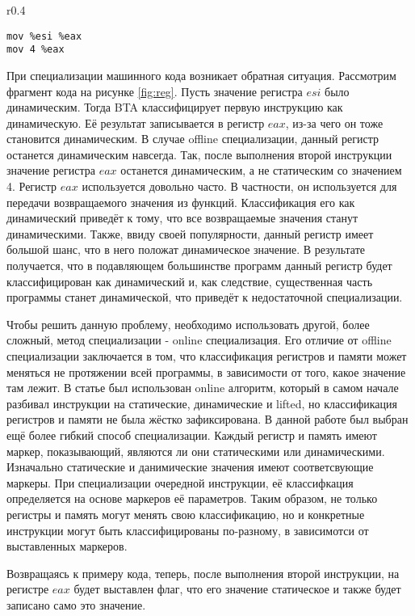 \documentclass{spbau-diploma}
\begin{document}
\begin{wrapfigure}{r}{0.4\textwidth}
\begin{lstlisting}[xleftmargin = 20pt]
mov %esi %eax
mov 4 %eax
\end{lstlisting}
\caption{Фрагмент кода}
\label{fig:reg}
\end{wrapfigure}
При специализации машинного кода возникает обратная ситуация. Рассмотрим фрагмент кода на рисунке \ref{fig:reg}. Пусть значение регистра $esi$ было динамическим. Тогда BTA классифицирует первую инструкцию как динамическую. Её результат записывается в регистр $eax$, из-за чего он тоже становится динамическим. В случае offline специализации, данный регистр останется динамическим навсегда. Так, после выполнения второй инструкции значение регистра $eax$ останется динамическим, а не статическим со значением 4. Регистр $eax$ используется довольно часто. В частности, он используется для передачи возвращаемого значения из функций. Классификация его как динамический приведёт к тому, что все возвращаемые значения станут динамическими. Также, ввиду своей популярности, данный регистр имеет большой шанс, что в него положат динамическое значение. В результате получается, что в подавляющем большинстве программ данный регистр будет классифицирован как динамический и, как следствие, существенная часть программы станет динамической, что приведёт к недостаточной специализации.

Чтобы решить данную проблему, необходимо использовать другой, более сложный, метод специализации - online специализация. Его отличие от offline специализации заключается в том, что классификация регистров и памяти может меняться не протяжении всей программы, в зависимости от того, какое значение там лежит. В статье \cite{PEMC} был использован online алгоритм, который в самом начале разбивал инструкции на статические, динамические и lifted, но классификация регистров и памяти не была жёстко зафиксирована. В данной работе был выбран ещё более гибкий способ специализации. Каждый регистр и память имеют маркер, показывающий, являются ли они статическими или динамическими. Изначально статические и данимические значения имеют соответсвующие маркеры. При специализации очередной инструкции, её классифкация определяется на основе маркеров её параметров. Таким образом, не только регистры и память могут менять свою классификацию, но и конкретные инструкции могут быть классифицированы по-разному, в зависимотси от выставленных маркеров.

Возвращаясь к примеру кода, теперь, после выполнения второй инструкции, на регистре $eax$ будет выставлен флаг, что его значение статическое и также будет записано само это значение.
\end{document}
